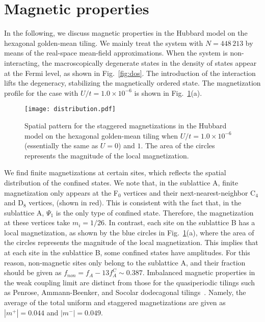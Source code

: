 \documentclass[aps,twocolumn,pra,superscriptaddress,amsmath,amssymb]{revtex4-1}
\begin{document}
\section{Magnetic properties}\label{sec:result}
In the following, we discuss magnetic properties
in the Hubbard model on the hexagonal golden-mean tiling.
We mainly treat the system with $N=448\,213$ by means of
the real-space mean-field approximations.
When the system is non-interacting,
the macroscopically degenerate states in the density of states
appear at the Fermi level,
as shown in Fig.~\ref{fig:dos}.
The introduction of the interaction lifts the degeneracy,
stabilizing the magnetically ordered state.
The magnetization profile for the case with $U/t=1.0\times 10^{-6}$
is shown in Fig.~\ref{fig:local}(a).
\begin{figure}[htb]
 \texttt{[image: distribution.pdf]}
 \caption{
   Spatial pattern for the staggered magnetizations in the Hubbard model
   on the hexagonal golden-mean tiling when
   $U/t=1.0\times 10^{-6}$ (essentially the same as $U=0$) and $1$.
   The area of the circles represents the magnitude of the local magnetization.
 }
 \label{fig:local}
\end{figure}
We find finite magnetizations at certain sites, which reflects the spatial distribution of the confined states.
We note that, in the sublattice A,
finite magnetization only appears at the F$_0$ vertices
and their next-nearest-neighbor C$_4$ and D$_8$ vertices, (shown in red).
This is consistent with the fact that, in the sublattice A,
 $\Psi_1$ is the only type of confined state.
Therefore, the magnetization at these vertices take $m_i=1/26$.
In contrast, each site on the sublattice B has
a local magnetization, as shown by the blue circles in Fig.~\ref{fig:local}(a), where the area of the circles represents the magnitude of the local magnetization.
This implies that at each site in the sublattice B,
some confined states have amplitudes.
For this reason, non-magnetic sites only belong to the sublattice A, and
their fraction should be given as $f_{non}=f_A-13f_A^C\sim 0.387$.
Imbalanced magnetic properties in the weak coupling limit are distinct
from those for the quasiperiodic tilings
such as Penrose, Ammann-Beenker, and Socolar dodecagonal tilings~\cite{Koga_Tsunetsugu,Koga_AB,Koga_dodeca}.
Namely, the average of the total uniform and staggered magnetizations
are given as $|m^+|=0.044$ and $|m^-|=0.049$.
\end{document}
